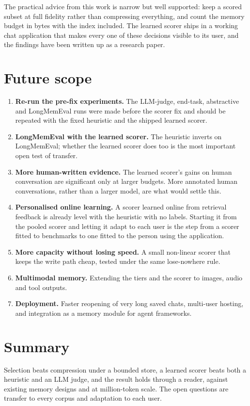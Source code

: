 The practical advice from this work is narrow but well supported: keep a
scored subset at full fidelity rather than compressing everything, and count
the memory budget in bytes with the index included. The learned scorer ships
in a working chat application that makes every one of these decisions visible
to its user, and the findings have been written up as a research paper.

\section{Future scope}
\begin{enumerate}
\item \textbf{Re-run the pre-fix experiments.} The LLM-judge, end-task,
  abstractive and LongMemEval runs were made before the scorer fix and should
  be repeated with the fixed heuristic and the shipped learned scorer.
\item \textbf{LongMemEval with the learned scorer.} The heuristic inverts on
  LongMemEval; whether the learned scorer does too is the most important open
  test of transfer.
\item \textbf{More human-written evidence.} The learned scorer's gains on
  human conversation are significant only at larger budgets. More annotated
  human conversations, rather than a larger model, are what would settle
  this.
\item \textbf{Personalised online learning.} A scorer learned online from
  retrieval feedback is already level with the heuristic with no labels.
  Starting it from the pooled scorer and letting it adapt to each user is the
  step from a scorer fitted to benchmarks to one fitted to the person using
  the application.
\item \textbf{More capacity without losing speed.} A small non-linear scorer
  that keeps the write path cheap, tested under the same lose-nowhere rule.
\item \textbf{Multimodal memory.} Extending the tiers and the scorer to
  images, audio and tool outputs.
\item \textbf{Deployment.} Faster reopening of very long saved chats,
  multi-user hosting, and integration as a memory module for agent
  frameworks.
\end{enumerate}

\section*{Summary}
Selection beats compression under a bounded store, a learned scorer beats both
a heuristic and an LLM judge, and the result holds through a reader, against
existing memory designs and at million-token scale. The open questions are
transfer to every corpus and adaptation to each user.
